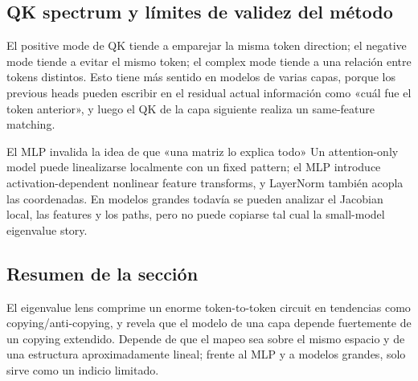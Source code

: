 
\subsection{QK spectrum y límites de validez del método}

El positive mode de QK tiende a emparejar la misma token direction; el negative mode tiende a evitar el mismo token; el complex mode tiende a una relación entre tokens distintos. Esto tiene más sentido en modelos de varias capas, porque los previous heads pueden escribir en el residual actual información como «cuál fue el token anterior», y luego el QK de la capa siguiente realiza un same-feature matching.



\begin{warningbox}{El MLP invalida la idea de que «una matriz lo explica todo»}
Un attention-only model puede linealizarse localmente con un fixed pattern; el MLP introduce activation-dependent nonlinear feature transforms, y LayerNorm también acopla las coordenadas. En modelos grandes todavía se pueden analizar el Jacobian local, las features y los paths, pero no puede copiarse tal cual la small-model eigenvalue story.
\end{warningbox}


\subsection{Resumen de la sección}

El eigenvalue lens comprime un enorme token-to-token circuit en tendencias como copying/anti-copying, y revela que el modelo de una capa depende fuertemente de un copying extendido. Depende de que el mapeo sea sobre el mismo espacio y de una estructura aproximadamente lineal; frente al MLP y a modelos grandes, solo sirve como un indicio limitado.

